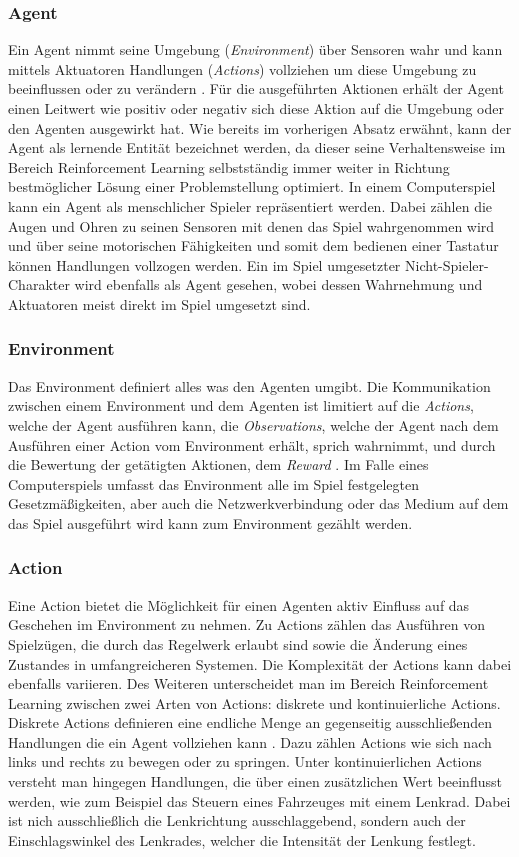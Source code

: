 \documentclass[11pt]{scrartcl}
\begin{document}
\subsubsection{Agent}
Ein Agent nimmt seine Umgebung (\textit{Environment}) über Sensoren wahr und kann mittels Aktuatoren
Handlungen (\textit{Actions}) vollziehen um diese Umgebung zu beeinflussen oder zu verändern 
\cite[~S.60]{RN2009}. Für die ausgeführten Aktionen erhält der Agent einen Leitwert wie positiv oder
negativ sich diese Aktion auf die Umgebung oder den Agenten ausgewirkt hat. Wie bereits im vorherigen
Absatz erwähnt, kann der Agent als lernende Entität bezeichnet werden, da dieser seine Verhaltensweise
im Bereich  Reinforcement Learning selbstständig immer weiter in Richtung bestmöglicher Lösung einer 
Problemstellung optimiert. In einem Computerspiel kann ein Agent als menschlicher Spieler
repräsentiert werden. Dabei zählen die Augen und Ohren zu seinen Sensoren mit denen das Spiel
wahrgenommen wird und über seine motorischen Fähigkeiten und somit dem bedienen einer Tastatur
können Handlungen vollzogen werden. Ein im Spiel umgesetzter Nicht-Spieler-Charakter wird ebenfalls
als Agent gesehen, wobei dessen Wahrnehmung und Aktuatoren meist direkt im Spiel umgesetzt sind.


\subsubsection{Environment}
Das Environment definiert alles was den Agenten umgibt. Die Kommunikation zwischen einem Environment
und dem Agenten ist limitiert auf die \textit{Actions}, welche der Agent ausführen kann, die 
\textit{Observations}, welche der Agent nach dem Ausführen einer Action vom Environment erhält, 
sprich wahrnimmt, und durch die Bewertung der getätigten Aktionen, dem \textit{Reward} 
\cite[~S.5]{L2018}. Im Falle eines Computerspiels umfasst das Environment alle im Spiel festgelegten
Gesetzmäßigkeiten, aber auch die Netzwerkverbindung oder das Medium auf dem das Spiel ausgeführt
wird kann zum Environment gezählt werden.

\subsubsection{Action}
Eine Action bietet die Möglichkeit für einen Agenten aktiv Einfluss auf das Geschehen im
Environment zu nehmen. Zu Actions zählen das Ausführen von Spielzügen, die durch das
Regelwerk erlaubt sind sowie die Änderung eines Zustandes in umfangreicheren Systemen. Die
Komplexität der Actions kann dabei ebenfalls variieren. Des Weiteren unterscheidet man im Bereich
Reinforcement Learning zwischen zwei Arten von Actions: diskrete und kontinuierliche Actions.
Diskrete Actions definieren eine endliche Menge an gegenseitig ausschließenden Handlungen die ein
Agent vollziehen kann \cite[~S.8]{L2018}. Dazu zählen Actions wie sich nach links und rechts zu
bewegen oder zu springen. Unter kontinuierlichen Actions versteht man hingegen Handlungen, die
über einen zusätzlichen Wert beeinflusst werden, wie zum Beispiel das Steuern eines Fahrzeuges
mit einem Lenkrad. Dabei ist nich ausschließlich die Lenkrichtung ausschlaggebend, sondern auch
der Einschlagswinkel des Lenkrades, welcher die Intensität der Lenkung festlegt.
\end{document}
